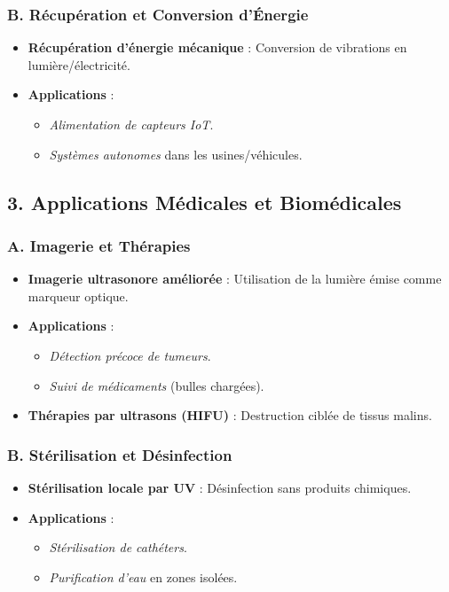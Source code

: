 \documentclass[a4paper,12pt]{article}
\begin{document}
\subsubsection*{B. Récupération et Conversion d’Énergie}
\begin{itemize}
    \item \textbf{Récupération d’énergie mécanique} : Conversion de vibrations en lumière/électricité.
    \item \textbf{Applications} :
    \begin{itemize}
        \item \textit{Alimentation de capteurs IoT}.
        \item \textit{Systèmes autonomes} dans les usines/véhicules.
    \end{itemize}
\end{itemize}

\subsection*{3. Applications Médicales et Biomédicales}
\subsubsection*{A. Imagerie et Thérapies}
\begin{itemize}
    \item \textbf{Imagerie ultrasonore améliorée} : Utilisation de la lumière émise comme marqueur optique.
    \item \textbf{Applications} :
    \begin{itemize}
        \item \textit{Détection précoce de tumeurs}.
        \item \textit{Suivi de médicaments} (bulles chargées).
    \end{itemize}
    \item \textbf{Thérapies par ultrasons (HIFU)} : Destruction ciblée de tissus malins.
\end{itemize}

\subsubsection*{B. Stérilisation et Désinfection}
\begin{itemize}
    \item \textbf{Stérilisation locale par UV} : Désinfection sans produits chimiques.
    \item \textbf{Applications} :
    \begin{itemize}
        \item \textit{Stérilisation de cathéters}.
        \item \textit{Purification d’eau} en zones isolées.
    \end{itemize}
\end{itemize}
\end{document}
